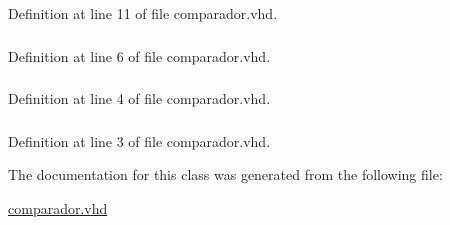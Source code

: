 Definition at line 11 of file comparador.\+vhd.

\hypertarget{classcomparador_a2edc34402b573437d5f25fa90ba4013e}{}
\subsubsection[{numeric\+\_\+std}]{\hspace{0.3cm}{\ttfamily [Package]}}\label{classcomparador_a2edc34402b573437d5f25fa90ba4013e}


Definition at line 6 of file comparador.\+vhd.

\hypertarget{classcomparador_aa4b2b25246a821511120e3149b003563}{}
\subsubsection[{S\+T\+D\+\_\+\+L\+O\+G\+I\+C\+\_\+1164}]{\hspace{0.3cm}{\ttfamily [Package]}}\label{classcomparador_aa4b2b25246a821511120e3149b003563}


Definition at line 4 of file comparador.\+vhd.

\hypertarget{classcomparador_a241c3e72dd8024cc8ae831b1b2aed7db}{}
\subsubsection[{S\+T\+D\+\_\+\+L\+O\+G\+I\+C\+\_\+\+U\+N\+S\+I\+G\+N\+E\+D}]{\hspace{0.3cm}{\ttfamily [Package]}}\label{classcomparador_a241c3e72dd8024cc8ae831b1b2aed7db}


Definition at line 3 of file comparador.\+vhd.



The documentation for this class was generated from the following file\+:\begin{DoxyCompactItemize}
\item 
\hyperlink{comparador_8vhd}{comparador.\+vhd}\end{DoxyCompactItemize}
